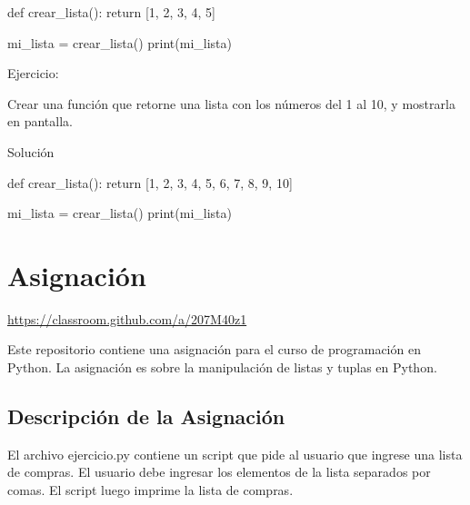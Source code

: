 \documentclass[
  a4paper,
  DIV=11,
  numbers=noendperiod,
  onepage,
  openany]{scrreprt}
\newenvironment{Shaded}{\begin{snugshade}}{\end{snugshade}}
\newcommand{\BuiltInTok}[1]{\textcolor[rgb]{0.00,0.23,0.31}{#1}}
\newcommand{\ControlFlowTok}[1]{\textcolor[rgb]{0.00,0.23,0.31}{#1}}
\newcommand{\DecValTok}[1]{\textcolor[rgb]{0.68,0.00,0.00}{#1}}
\newcommand{\KeywordTok}[1]{\textcolor[rgb]{0.00,0.23,0.31}{#1}}
\newcommand{\NormalTok}[1]{\textcolor[rgb]{0.00,0.23,0.31}{#1}}
\newcommand{\OperatorTok}[1]{\textcolor[rgb]{0.37,0.37,0.37}{#1}}
\begin{document}
\begin{Shaded}
\begin{Highlighting}[]
\KeywordTok{def}\NormalTok{ crear\_lista():}
    \ControlFlowTok{return}\NormalTok{ [}\DecValTok{1}\NormalTok{, }\DecValTok{2}\NormalTok{, }\DecValTok{3}\NormalTok{, }\DecValTok{4}\NormalTok{, }\DecValTok{5}\NormalTok{]}

\NormalTok{mi\_lista }\OperatorTok{=}\NormalTok{ crear\_lista()}
\BuiltInTok{print}\NormalTok{(mi\_lista)}
\end{Highlighting}
\end{Shaded}

Ejercicio:

Crear una función que retorne una lista con los números del 1 al 10, y
mostrarla en pantalla.

Solución

\begin{Shaded}
\begin{Highlighting}[]
  \KeywordTok{def}\NormalTok{ crear\_lista():}
      \ControlFlowTok{return}\NormalTok{ [}\DecValTok{1}\NormalTok{, }\DecValTok{2}\NormalTok{, }\DecValTok{3}\NormalTok{, }\DecValTok{4}\NormalTok{, }\DecValTok{5}\NormalTok{, }\DecValTok{6}\NormalTok{, }\DecValTok{7}\NormalTok{, }\DecValTok{8}\NormalTok{, }\DecValTok{9}\NormalTok{, }\DecValTok{10}\NormalTok{]}

\NormalTok{  mi\_lista }\OperatorTok{=}\NormalTok{ crear\_lista()}
  \BuiltInTok{print}\NormalTok{(mi\_lista)}
\end{Highlighting}
\end{Shaded}

\chapter{Asignación}\label{asignaciuxf3n-2}

\url{https://classroom.github.com/a/207M40z1}

Este repositorio contiene una asignación para el curso de programación
en Python. La asignación es sobre la manipulación de listas y tuplas en
Python.

\section{Descripción de la
Asignación}\label{descripciuxf3n-de-la-asignaciuxf3n}

El archivo ejercicio.py contiene un script que pide al usuario que
ingrese una lista de compras. El usuario debe ingresar los elementos de
la lista separados por comas. El script luego imprime la lista de
compras.
\end{document}
